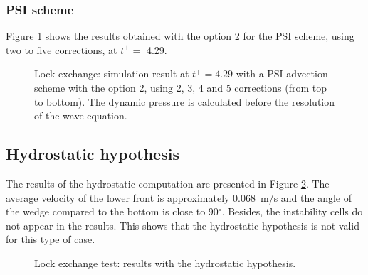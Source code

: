 \subsubsection{PSI scheme}
Figure \ref{fig:lock-exchange_dp_yes_PSI2} shows the results
obtained with the option 2 for the PSI scheme, using two to five corrections, at $t^+=$ 4.29.
\begin{figure}[ht]
  \begin{center}
    \caption{Lock-exchange: simulation result at $t^+=4.29$ with a PSI advection scheme with the
      option 2, using 2, 3, 4 and 5 corrections (from top to bottom).
      The dynamic pressure is calculated before the resolution of the wave equation.}
    \label{fig:lock-exchange_dp_yes_PSI2}
  \end{center}
\end{figure}

\clearpage

\subsection{Hydrostatic hypothesis}

The results of the hydrostatic computation are presented in Figure
\ref{t3d:lock-exchange:hydro_res}.
The average velocity of the lower front is approximately 0.068~m/s and
the angle of the wedge compared to the bottom is close to 90$^\circ$.
Besides, the instability cells do not appear in the results.
This shows that the hydrostatic hypothesis is not valid for this type of
case.
\begin{figure}[h]
  \centering
  \caption{Lock exchange test: results with the hydrostatic hypothesis.}
  \label{t3d:lock-exchange:hydro_res}
\end{figure}
%
